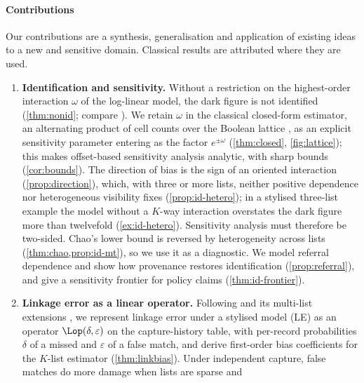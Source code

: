 %
%
\paragraph{Contributions}
Our contributions are a synthesis, generalisation and application of
existing ideas to a new and sensitive domain. Classical results are
attributed where they are used.
\begin{enumerate}[label=\textbf{C\arabic*},ref=C\arabic*,leftmargin=2.4em,itemsep=3pt]
  \item\label{contrib:id} \textbf{Identification and sensitivity.} Without a
  restriction on the highest-order interaction $\omega$ of the log-linear
  model, the dark figure is not identified (\cref{thm:nonid}; compare
  \citealp{aleshinguendel2024}). We retain $\omega$ in the classical
  closed-form estimator, an alternating product of cell counts over the
  Boolean lattice \citep{fienberg1972,bishop1975}, as an explicit sensitivity
  parameter entering as the factor $e^{\pm\omega}$ (\cref{thm:closed},
  \cref{fig:lattice}); this makes offset-based sensitivity analysis
  \citep{gerritse2015} analytic, with sharp bounds (\cref{cor:bounds}). The
  direction of bias is the sign of an oriented interaction
  (\cref{prop:direction}), which, with three or more lists, neither positive
  dependence nor heterogeneous visibility fixes (\cref{prop:id-hetero}); in a
  stylised three-list example the model without a $K$-way interaction
  overstates the dark figure more than twelvefold (\cref{ex:id-hetero}).
  Sensitivity analysis must therefore be two-sided. Chao's lower bound
  \citep{chao1987} is reversed by heterogeneity across lists
  (\cref{thm:chao,prop:id-mt}), so we use it as a diagnostic. We model
  referral dependence and show how provenance restores identification
  (\cref{prop:referral}), and give a sensitivity frontier for policy claims
  (\cref{thm:id-frontier}).
  \item\label{contrib:link} \textbf{Linkage error as a linear operator.}
  Following \citet{ding1994} and its multi-list extensions
  \citep{ding1996,diconsiglio2018}, we represent linkage error under a
  stylised model (LE) as an operator $\Lop(\delta,\varepsilon)$ on the
  capture-history table, with per-record probabilities $\delta$ of a missed
  and $\varepsilon$ of a false match, and derive first-order bias
  coefficients for the $K$-list estimator (\cref{thm:linkbias}). Under
  independent capture, false matches do more damage when lists are sparse and

\end{enumerate}
